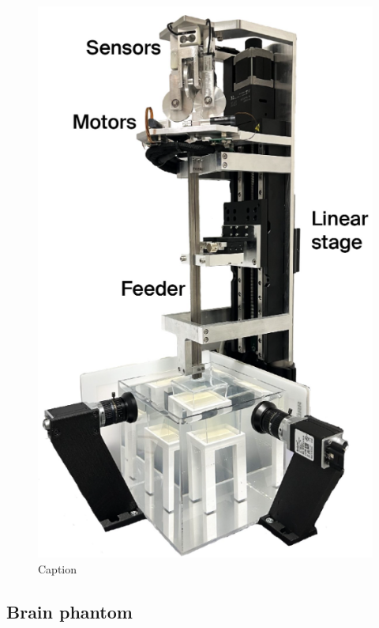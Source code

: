 \begin{figure} [H]
    \centering
    \includegraphics[width=0.5\linewidth]{images/Hardware/insertionStrategy.PNG}
    \caption{Caption}
    \label{fig:enter-label}
\end{figure}



\subsection{Brain phantom}
